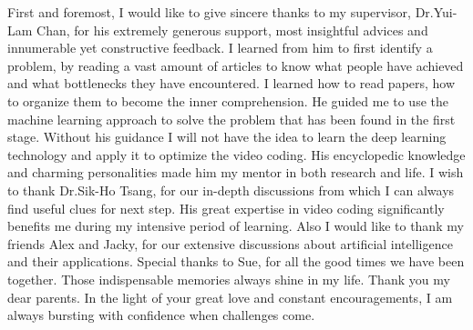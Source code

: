 \documentclass{report}
\begin{document}
    First and foremost, I would like to give sincere thanks to my supervisor,
    Dr.Yui-Lam Chan, for his
    extremely generous support, most insightful advices and innumerable yet
    constructive feedback.
    I learned from him to first identify a problem,
    by reading a vast amount of articles
    to know what people have achieved and what bottlenecks they have encountered.
    I learned how to read papers, how to organize them to
    become the inner comprehension.
    He guided me to use the machine learning approach to solve the
    problem that has been found in the first stage.
    Without his guidance I will not have the idea to learn the deep
    learning technology and apply it to optimize the video coding.
    His encyclopedic knowledge and charming personalities made him my mentor in
    both research and life.
    I wish to thank Dr.Sik-Ho Tsang, for our in-depth discussions from
    which I can always find useful clues for next step.
    His great expertise in video coding significantly benefits me during my
    intensive period of learning.
    Also I would like to thank my friends Alex
    and Jacky, for our
    extensive discussions about artificial intelligence
    and their applications.
    Special thanks to Sue, for all the good times
    we have been together. Those indispensable
    memories always shine in my life.
    Thank you my dear parents. In the light of your 
    great love and constant encouragements, 
    I am always bursting with confidence 
    when challenges come.
    \afterpreface
    
    
    
    
    
    
    \printbibliography[heading=bibintoc]
\end{document}
